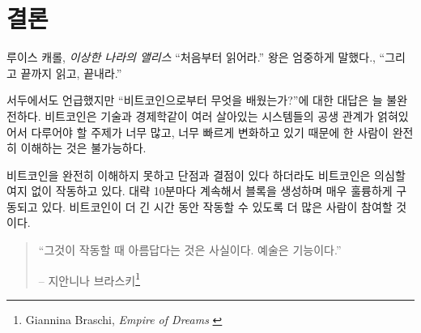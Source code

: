 \label{ch:conclusion}

\chapter*{결론}

\begin{chapquote}{루이스 캐롤, \textit{이상한 나라의 앨리스}}
	\enquote{처음부터 읽어라.} 왕은 엄중하게 말했다., \enquote{그리고 끝까지 읽고, 끝내라.}
\end{chapquote}

\begin{comment}
	As mentioned in the beginning, I think that any answer to the
	question \textit{“What have you learned from Bitcoin?”} will always be incomplete. The
	symbiosis of what can be seen as multiple living systems -- Bitcoin, the
	technosphere, and economics -- is too intertwined, the topics too numerous, and
	things are moving too fast to ever be fully understood by a single person.
\end{comment}
서두에서도 언급했지만 \enquote{비트코인으로부터 무엇을 배웠는가?}에 대한 대답은 
늘 불완전하다.
비트코인은 기술과 경제학같이 여러 살아있는 시스템들의 공생 관계가 얽혀있어서 다루어야 할 주제가 너무 많고, 
너무 빠르게 변화하고 있기 때문에 한 사람이 완전히 이해하는 것은 불가능하다.

\begin{comment}
	Even without understanding it fully, and even with all its quirks and seeming
	shortcomings, Bitcoin undoubtedly works. It keeps producing blocks roughly every
	ten minutes and does so beautifully. The longer Bitcoin continues to work, the
	more people will opt-in to use it.
\end{comment}
비트코인을 완전히 이해하지 못하고 단점과 결점이 있다 하더라도 
비트코인은 의심할 여지 없이 작동하고 있다.
대략 10분마다 계속해서 블록을 생성하며 매우 훌륭하게 구동되고 있다.
비트코인이 더 긴 시간 동안 작동할 수 있도록 더 많은 사람이 참여할 것이다.

\begin{quotation}\begin{samepage}
		\enquote{그것이 작동할 때 아름답다는 것은 사실이다. 예술은 기능이다.}
		\begin{flushright} -- 지안니나 브라스키\footnote{Giannina Braschi, \textit{Empire of Dreams} \cite{braschi2011empire}}
\end{flushright}\end{samepage}\end{quotation}

